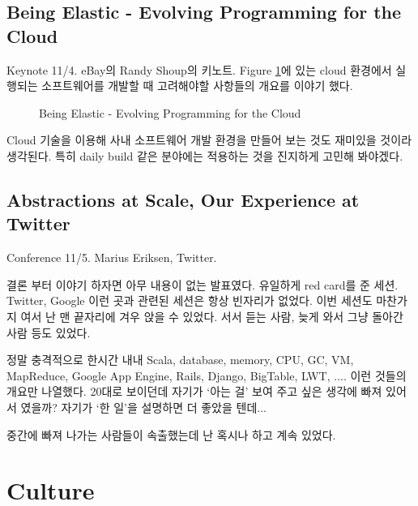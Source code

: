 \documentclass[11pt]{article}
\begin{document}
\subsection{Being Elastic - Evolving Programming for the Cloud}

Keynote 11/4. eBay의 Randy Shoup의 키노트.
Figure \ref{cloud}에 있는 cloud 환경에서 실행되는 소프트웨어를 개발할 때
고려해야할 사항들의 개요를 이야기 했다.


\begin{figure}[t]
    \begin{Frame}
        \begin{center}
        \end{center}
    \end{Frame}
    \caption{Being Elastic - Evolving Programming for the Cloud}
    \label{cloud}
\end{figure}

Cloud 기술을 이용해 사내 소프트웨어 개발 환경을 만들어 보는 것도 재미있을 
것이라 생각된다. 특히 daily build 같은 분야에는 적용하는 것을 진지하게 
고민해 봐야겠다.

\subsection{Abstractions at Scale, Our Experience at Twitter}

Conference 11/5. Marius Eriksen, Twitter.

결론 부터 이야기 하자면 아무 내용이 없는 발표였다. 유일하게 red card를
준 세션.
Twitter, Google 이런 곳과 관련된 세션은 항상 빈자리가 없었다. 이번
세션도 마찬가지 여서 난 맨 끝자리에 겨우 앉을 수 있었다. 서서 듣는
사람, 늦게 와서 그냥 돌아간 사람 등도 있었다.
 
정말 충격적으로 한시간 내내 Scala, database, memory, CPU, GC, VM,
MapReduce, Google App Engine, Rails, Django, BigTable, LWT, .... 이런
것들의 개요만 나열했다.
20대로 보이던데 자기가 `아는 걸' 보여 주고 싶은 생각에 빠져 있어서
였을까? 자기가 `한 일'을 설명하면 더 좋았을 텐데...
 
중간에 빠져 나가는 사람들이 속출했는데 난 혹시나 하고 계속 있었다. 

\section{Culture}
\end{document}
